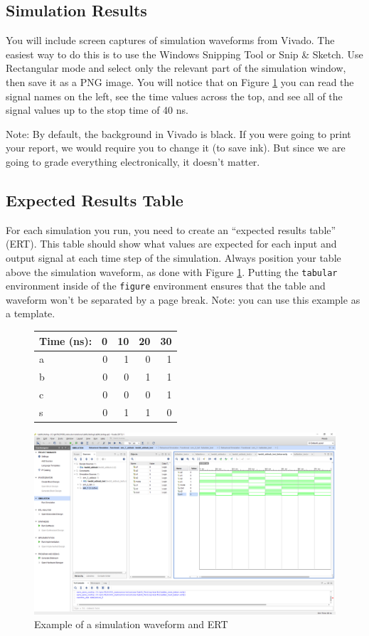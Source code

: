 \documentclass[11pt]{article}
\begin{document}
\subsection*{Simulation Results}
You will include screen captures of simulation waveforms from Vivado.  The easiest way to do this is to use the Windows Snipping Tool or Snip \& Sketch.  Use Rectangular mode and select only the relevant part of the simulation window, then save it as a PNG image.  You will notice that on Figure \ref{fig:sim_with_table} you can read the signal names on the left, see the time values across the top, and see all of the signal values up to the stop time of 40 ns. 

Note: By default, the background in Vivado is black. If you were going to print your report, we would require you to change it (to save ink).  But since we are going to grade everything electronically, it doesn't matter.


\subsection*{Expected Results Table}
For each simulation you run, you need to create an ``expected results table'' (ERT).  This table should show what values are expected for each input and output signal at each time step of the simulation.  Always position your table above the simulation waveform, as done with Figure \ref{fig:sim_with_table}.  Putting the \texttt{tabular} environment inside of the \texttt{figure} environment ensures that the table and waveform won't be separated by a page break.  Note: you can use this example as a template.

\begin{figure}[ht]\centering
	\begin{tabular}{l|rrrr}
		Time (ns): & 0 & 10 & 20 & 30 \\
		\midrule
		a & 0 & 1 & 0 & 1 \\
		b & 0 & 0 & 1 & 1 \\
		\midrule
		c & 0 & 0 & 0 & 1 \\
		s & 0 & 1 & 1 & 0 \\
		\bottomrule
	\end{tabular}\medskip
	
	\includegraphics[width=1.7\linewidth]{Lab1Table}
	\caption{Example of a simulation waveform and ERT}
	\label{fig:sim_with_table}
\end{figure}
\end{document}
